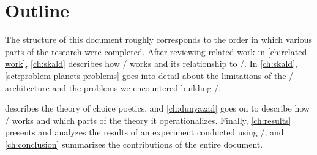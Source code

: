 \section{Outline}


The structure of this document roughly corresponds to the order in which various parts of the research were completed.
%
After reviewing related work in \cref{ch:related-work}, \cref{ch:skald} describes how \skald/ works and its relationship to \minstrel/.
%
In \cref{ch:skald}, \cref{sct:problem-planets-problems} goes into detail about the limitations of the \minstrel/ architecture and the problems we encountered building \problemplanets/.


 describes the theory of choice poetics, and \cref{ch:dunyazad} goes on to describe how \dunyazad/ works and which parts of the theory it operationalizes.
%
Finally, \cref{ch:results} presents and analyzes the results of an experiment conducted using \dunyazad/, and \cref{ch:conclusion} summarizes the contributions of the entire document.
